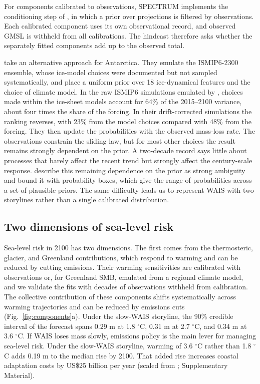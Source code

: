 \documentclass[draft,linenumbers]{agujournal2025}
\begin{document}
For components calibrated to observations, SPECTRUM implements the conditioning step of \citet{Aschwanden2021}, in which a prior over projections is filtered by observations. Each calibrated component uses its own observational record, and observed GMSL is withheld from all calibrations. The hindcast therefore asks whether the separately fitted components add up to the observed total.

\citet{Lin2026} take an alternative approach for Antarctica. They emulate the ISMIP6-2300 ensemble, whose ice-model choices were documented but not sampled systematically, and place a uniform prior over 18 ice-dynamical features and the choice of climate model. In the raw ISMIP6 simulations emulated by \citet{Lin2026}, choices made within the ice-sheet models account for 64\% of the 2015--2100 variance, about four times the share of the forcing. In their drift-corrected simulations the ranking reverses, with 23\% from the model choices compared with 48\% from the forcing. They then update the probabilities with the observed mass-loss rate. The observations constrain the sliding law, but for most other choices the result remains strongly dependent on the prior. A two-decade record says little about processes that barely affect the recent trend but strongly affect the century-scale response. \citet{Lin2026} describe this remaining dependence on the prior as strong ambiguity and bound it with probability boxes, which give the range of probabilities across a set of plausible priors. The same difficulty leads us to represent WAIS with two storylines rather than a single calibrated distribution.

\subsection{Two dimensions of sea-level risk}

Sea-level risk in 2100 has two dimensions. The first comes from the thermosteric, glacier, and Greenland contributions, which respond to warming and can be reduced by cutting emissions. Their warming sensitivities are calibrated with observations or, for Greenland SMB, emulated from a regional climate model, and we validate the fits with decades of observations withheld from calibration. The collective contribution of these components shifts systematically across warming trajectories and can be reduced by emissions cuts (Fig.~\ref{fig:components}a). Under the slow-WAIS storyline, the 90\% credible interval of the forecast spans 0.29 m at 1.8 $^\circ$C, 0.31 m at 2.7 $^\circ$C, and 0.34 m at 3.6 $^\circ$C. If WAIS loses mass slowly, emissions policy is the main lever for managing sea-level risk. Under the slow-WAIS storyline, warming of 3.6 $^\circ$C rather than 1.8 $^\circ$C adds 0.19 m to the median rise by 2100. That added rise increases coastal adaptation costs by US\$25 billion per year (scaled from \citet{Tiggeloven2020}; Supplementary Material).
\end{document}
